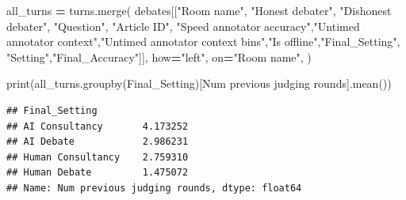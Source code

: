 \documentclass[
]{article}
\newenvironment{Shaded}{\begin{snugshade}}{\end{snugshade}}
\newcommand{\BuiltInTok}[1]{#1}
\newcommand{\NormalTok}[1]{#1}
\newcommand{\OperatorTok}[1]{\textcolor[rgb]{0.81,0.36,0.00}{\textbf{#1}}}
\newcommand{\StringTok}[1]{\textcolor[rgb]{0.31,0.60,0.02}{#1}}
\begin{document}
\begin{Shaded}
\begin{Highlighting}[]
\NormalTok{all\_turns }\OperatorTok{=}\NormalTok{ turns.merge(}
\NormalTok{        debates[[}\StringTok{"Room name"}\NormalTok{, }\StringTok{"Honest debater"}\NormalTok{, }\StringTok{"Dishonest debater"}\NormalTok{, }\StringTok{"Question"}\NormalTok{, }\StringTok{"Article ID"}\NormalTok{,}
                 \StringTok{"Speed annotator accuracy"}\NormalTok{,}\StringTok{"Untimed annotator context"}\NormalTok{,}\StringTok{"Untimed annotator context bins"}\NormalTok{,}\StringTok{"Is offline"}\NormalTok{,}\StringTok{"Final\_Setting"}\NormalTok{, }\StringTok{"Setting"}\NormalTok{,}\StringTok{"Final\_Accuracy"}\NormalTok{]],}
\NormalTok{        how}\OperatorTok{=}\StringTok{"left"}\NormalTok{,}
\NormalTok{        on}\OperatorTok{=}\StringTok{"Room name"}\NormalTok{,}
\NormalTok{    )}

\BuiltInTok{print}\NormalTok{(all\_turns.groupby(}\StringTok{\textquotesingle{}Final\_Setting\textquotesingle{}}\NormalTok{)[}\StringTok{\textquotesingle{}Num previous judging rounds\textquotesingle{}}\NormalTok{].mean())}
\end{Highlighting}
\end{Shaded}

\begin{verbatim}
## Final_Setting
## AI Consultancy       4.173252
## AI Debate            2.986231
## Human Consultancy    2.759310
## Human Debate         1.475072
## Name: Num previous judging rounds, dtype: float64
\end{verbatim}
\end{document}
